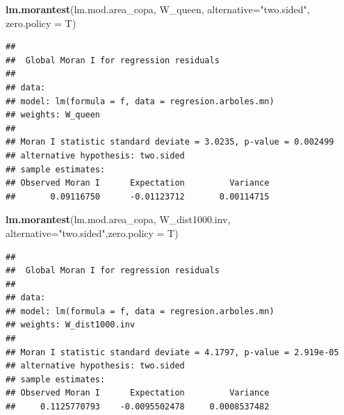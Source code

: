 \documentclass[12pt,]{book}
\newenvironment{Shaded}{\begin{snugshade}}{\end{snugshade}}
\newcommand{\KeywordTok}[1]{\textcolor[rgb]{0.13,0.29,0.53}{\textbf{#1}}}
\newcommand{\DataTypeTok}[1]{\textcolor[rgb]{0.13,0.29,0.53}{#1}}
\newcommand{\StringTok}[1]{\textcolor[rgb]{0.31,0.60,0.02}{#1}}
\newcommand{\NormalTok}[1]{#1}
\begin{document}
\begin{Shaded}
\begin{Highlighting}[]
\KeywordTok{lm.morantest}\NormalTok{(lm.mod.area_copa, }
\NormalTok{             W_queen, }\DataTypeTok{alternative=}\StringTok{"two.sided"}\NormalTok{,}
             \DataTypeTok{zero.policy =}\NormalTok{ T)}
\end{Highlighting}
\end{Shaded}

\begin{verbatim}
## 
##  Global Moran I for regression residuals
## 
## data:  
## model: lm(formula = f, data = regresion.arboles.mn)
## weights: W_queen
## 
## Moran I statistic standard deviate = 3.0235, p-value = 0.002499
## alternative hypothesis: two.sided
## sample estimates:
## Observed Moran I      Expectation         Variance 
##       0.09116750      -0.01123712       0.00114715
\end{verbatim}

\begin{Shaded}
\begin{Highlighting}[]
\KeywordTok{lm.morantest}\NormalTok{(lm.mod.area_copa, }
\NormalTok{             W_dist1000.inv, }
             \DataTypeTok{alternative=}\StringTok{"two.sided"}\NormalTok{,}\DataTypeTok{zero.policy =}\NormalTok{ T)}
\end{Highlighting}
\end{Shaded}

\begin{verbatim}
## 
##  Global Moran I for regression residuals
## 
## data:  
## model: lm(formula = f, data = regresion.arboles.mn)
## weights: W_dist1000.inv
## 
## Moran I statistic standard deviate = 4.1797, p-value = 2.919e-05
## alternative hypothesis: two.sided
## sample estimates:
## Observed Moran I      Expectation         Variance 
##     0.1125770793    -0.0095502478     0.0008537482
\end{verbatim}
\end{document}
